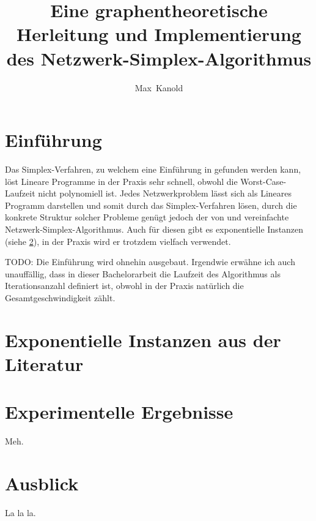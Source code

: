 \documentclass[11pt,a4paper,twoside,ngerman,openany]{book}
\author{Max~Kanold}
\title{Eine graphentheoretische Herleitung und Implementierung des Netzwerk-Simplex-Algorithmus}
\theoremstyle{plain}
\theoremstyle{definition}
\begin{document}
\frontmatter
\maketitle
\cleardoublepage
\tableofcontents
\cleardoublepage

\mainmatter
\chapter{Einführung}
Das Simplex-Verfahren, zu welchem eine Einführung in \cite{NSAbook} gefunden werden kann, löst Lineare Programme in der Praxis sehr schnell, obwohl die Worst-Case-Laufzeit nicht polynomiell ist. Jedes Netzwerkproblem lässt sich als Lineares Programm darstellen und somit durch das Simplex-Verfahren lösen, durch die konkrete Struktur solcher Probleme genügt jedoch der von \cite[Dantzig, 1951]{erf1} und \cite[Orden, 1956]{erf2} vereinfachte Netzwerk-Simplex-Algorithmus. Auch für diesen gibt es exponentielle Instanzen (siehe \cref{ch:lit}), in der Praxis wird er trotzdem vielfach verwendet.

TODO: Die Einführung wird ohnehin ausgebaut. Irgendwie erwähne ich auch unauffällig, dass in dieser Bachelorarbeit die Laufzeit des Algorithmus als Iterationsanzahl definiert ist, obwohl in der Praxis natürlich die Gesamtgeschwindigkeit zählt.



\chapter{Exponentielle Instanzen aus der Literatur}\label{ch:lit}

\chapter{Experimentelle Ergebnisse}\label{ch:erg}
Meh.

\chapter{Ausblick}
La la la.

\backmatter
{}

\end{document}
